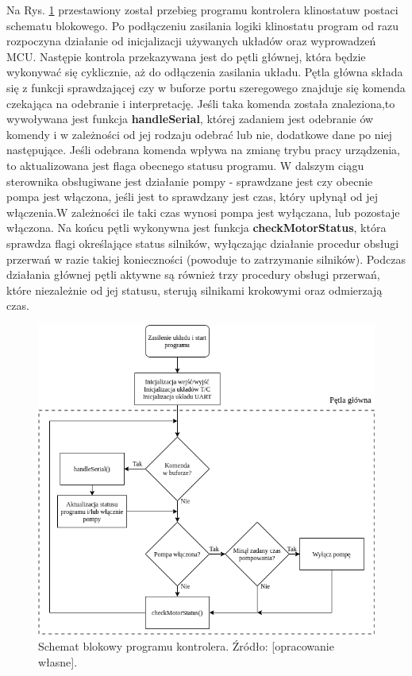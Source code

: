 Na Rys. \ref{fig:schemat_sterownik} przestawiony został przebieg programu kontrolera klinostatu\linebreak w postaci schematu blokowego. Po podłączeniu zasilania logiki klinostatu program od razu rozpoczyna działanie od inicjalizacji używanych układów oraz wyprowadzeń MCU. Następie kontrola przekazywana jest do pętli głównej, która będzie wykonywać się cyklicznie, aż do odłączenia zasilania układu. Pętla główna składa się z funkcji sprawdzającej czy w buforze portu szeregowego znajduje się komenda czekająca na odebranie i interpretację. Jeśli taka komenda została znaleziona,\linebreak to wywoływana jest funkcja \textbf{handleSerial}, której zadaniem jest odebranie ów komendy i w zależności od jej rodzaju odebrać lub nie, dodatkowe dane po niej następujące. Jeśli odebrana komenda wpływa na zmianę trybu pracy urządzenia, to aktualizowana jest flaga obecnego statusu programu. W dalszym ciągu sterownika obsługiwane jest działanie pompy - sprawdzane jest czy obecnie pompa jest włączona, jeśli jest to sprawdzany jest czas, który upłynął od jej włączenia.\linebreak W zależności ile taki czas wynosi pompa jest wyłączana, lub pozostaje włączona. Na końcu pętli wykonywna jest funkcja \textbf{checkMotorStatus}, która sprawdza flagi określające status silników, wyłączając działanie procedur obsługi przerwań w razie takiej konieczności (powoduje to zatrzymanie silników). Podczas działania głównej pętli aktywne są również trzy procedury obsługi przerwań, które niezależnie od jej statusu, sterują silnikami krokowymi oraz odmierzają czas.
\begin{figure}[H]
	\centering
	\includegraphics[scale=0.5]{sterownik_schemat}
	\caption{Schemat blokowy programu kontrolera. Źródło: [opracowanie własne].} 
	\label{fig:schemat_sterownik}
\end{figure}


